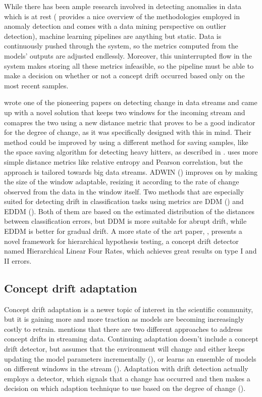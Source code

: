 \documentclass[12pt]{extreport}
\begin{document}
While there has been ample research involved in detecting anomalies in data which is at rest (\cite{survey-outlier-detection} provides a nice overview of the methodologies employed in anomaly detection and \cite{there-and-back-again} comes with a data mining perspective on outlier detection), machine learning pipelines are anything but static. Data is continuously pushed through the system, so the metrics computed from the models’ outputs are adjusted endlessly. Moreover, this uninterrupted flow in the system makes storing all these metrics infeasible, so the pipeline must be able to make a decision on whether or not a concept drift occurred based only on the most recent samples.

\cite{detecting-change-in-data-streams} wrote one of the pioneering papers on detecting change in data streams and came up with a novel solution that keeps two windows for the incoming stream and comapres the two using a new distance metric that proves to be a good indicator for the degree of change, as it was specifically designed with this in mind. Their method could be improved by using a different method for saving samples, like the space saving algorithm for detecting heavy hitters, as described in \cite{hierarchical-heavy-hitters}. \cite{onlineanomalydetection} uses more simple distance metrics like relative entropy and Pearson correlation, but the approach is tailored towards big data streams. ADWIN (\cite{adwin}) improves on \cite{detecting-change-in-data-streams} by making the size of the window adaptable, resizing it according to the rate of change observed from the data in the window itself. Two methods that are especially suited for detecting drift in classification tasks using metrics are DDM (\cite{ddm}) and EDDM (\cite{eddm}). Both of them are based on the estimated distribution of the distances between classification errors, but DDM is more suitable for abrupt drift, while EDDM is better for gradual drift. A more state of the art paper, \cite{hht}, presents a novel framework for hierarchical hypothesis testing, a concept drift detector named Hierarchical Linear Four Rates, which achieves great results on type I and II errors.

\subsection{Concept drift adaptation}

Concept drift adaptation is a newer topic of interest in the scientific community, but it is gaining more and more traction as models are becoming increasingly costly to retrain. \cite{hht} mentions that there are two different approaches to address concept drifts in streaming data. Continuing adaptation doesn’t include a concept drift detector, but assumes that the environment will change and either keeps updating the model parameters incrementally (\cite{adwin}), or learns an ensemble of models on different windows in the stream (\cite{incremental-learning-of-concept-drift}). Adaptation with drift detection actually employs a detector, which signals that a change has occurred and then makes a decision on which adaption technique to use based on the degree of change (\cite{concept-drift-detection-for-streaming-data}).
\end{document}
